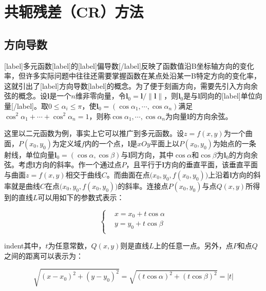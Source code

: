 \documentclass[UTF8,nofonts]{ctexart}
\begin{document}

\section*{共轭残差（CR）方法}

\subsection*{方向导数}

[label]多元函数[label]的[label]偏导数[/label]反映了函数值沿B坐标轴方向的变化率，但许多实际问题中往往还需要掌握函数在某点处沿某一B特定方向的变化率，这就引出了[label]方向导数[label]的概念。为了便于刻画方向，需要先引入方向余弦的概念。设$\boldsymbol{l}$是一个$n$维非零向量，令$\boldsymbol{l}_0=\boldsymbol{l}/\|\boldsymbol{l}\|$，则$\boldsymbol{l}_0$是与$\boldsymbol{l}$同向的[label]单位向量[/label]。取$0\leq\alpha_i\leq\pi$，使$\boldsymbol{l}_0=(\cos\alpha_1,\cdots,\cos\alpha_n)$满足$\cos^2\alpha_1+\cdots+\cos^2\alpha_n=1$，则称$\cos\alpha_1,\cdots,\cos\alpha_n$为向量$\boldsymbol{l}$的方向余弦。

这里以二元函数为例，事实上它可以推广到多元函数。设$z=f(x,y)$为一个曲面，$P(x_0,y_0)$为定义域$f$内的一个点，$\boldsymbol{l}$是$xOy$平面上以$P(x_0,y_0)$为始点的一条射线，单位向量$\boldsymbol{l}_0=(\cos\alpha,\cos\beta)$与$\boldsymbol{l}$同方向，其中$\cos\alpha$和$\cos\beta$为$\boldsymbol{l}_0$的方向余弦。考虑$\boldsymbol{l}$方向的斜率。作一个通过点$P$，且平行于$\boldsymbol{l}$方向的垂直平面，该垂直平面与曲面$z=f(x,y)$相交于曲线$C$。而曲面在点$\big(x_0,y_0,f(x_0,y_0)\big)$上沿着$\boldsymbol{l}$方向的斜率就是曲线$C$在点$\big(x_0,y_0,f(x_0,y_0)\big)$的斜率。连接点$P(x_0,y_0)$与点$Q(x,y)$所得到的直线$L$可以用如下的参数式表示：

\begin{equation}
\label{eq:xy}
\begin{cases}
	& x  = x_0+t\cos\alpha \\
	& y  = y_0+t\cos\beta \\
\end{cases}
\end{equation}

indent其中，$t$为任意常数，$Q(x,y)$则是直线$L$上的任意一点。另外，点$P$和点$Q$之间的距离可以表示为：

\begin{equation}
\label{eq:pqdist}
\sqrt{(x-x_0)^2+(y-y_0)^2}=\sqrt{(t\cos\alpha)^2+(t\cos\beta)^2}=|t|
\end{equation}
\end{document}

